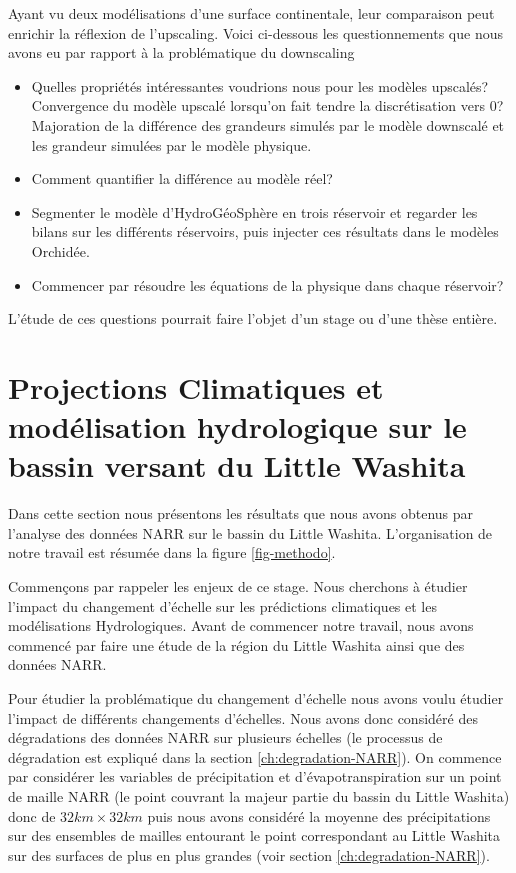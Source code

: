 \documentclass[a4paper,11pt]{article}
\numberwithin{equation}{section}
\begin{document}
Ayant vu deux modélisations d'une surface continentale, leur comparaison peut enrichir la réflexion de l'upscaling. Voici ci-dessous les questionnements que nous avons eu par rapport à la problématique du downscaling

\begin{itemize}
	\item Quelles propriétés intéressantes voudrions nous pour les modèles upscalés? 
	\subitem Convergence du modèle upscalé lorsqu'on fait tendre la discrétisation vers $0$? 
	\subitem Majoration de la différence des grandeurs simulés par le modèle downscalé et les grandeur simulées par le modèle physique.   
	\item Comment quantifier la différence au modèle réel?
	\item Segmenter le modèle d'HydroGéoSphère en trois réservoir et regarder les bilans sur les différents réservoirs, puis injecter ces résultats dans le modèles Orchidée.
	\item Commencer par résoudre les équations de la physique dans chaque réservoir?
\end{itemize}

L'étude de ces questions pourrait faire l'objet d'un stage ou d'une thèse entière. 

\newpage
\section{Projections Climatiques et modélisation hydrologique sur le bassin versant du Little Washita}
\label{ch:proj-climatique-mod-hydro}

Dans cette section nous présentons les résultats que nous avons obtenus par l'analyse des données NARR sur le bassin du Little Washita. L'organisation de notre travail est résumée dans la figure \ref{fig-methodo}.

Commençons par rappeler les enjeux de ce stage. Nous cherchons à étudier l'impact du changement d'échelle sur les prédictions climatiques et les modélisations Hydrologiques. Avant de commencer notre travail, nous avons commencé par faire une étude de la région du Little Washita ainsi que des données NARR.

Pour étudier la problématique du changement d'échelle nous avons voulu étudier l'impact de différents changements d'échelles. Nous avons donc considéré des dégradations des données NARR sur plusieurs échelles (le processus de dégradation est expliqué dans la section \ref{ch:degradation-NARR}). On commence par considérer les variables de précipitation et d'évapotranspiration sur un point de maille NARR (le point couvrant la majeur partie du bassin du Little Washita) donc de $32km\times 32km$ puis nous avons considéré la moyenne des précipitations sur des ensembles de mailles entourant le point correspondant au Little Washita sur des surfaces de plus en plus grandes (voir section \ref{ch:degradation-NARR}).
\end{document}
